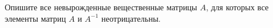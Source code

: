 \documentclass{article}
\begin{document}
Опишите все невырожденные вещественные матрицы $A$, для которых все элементы матриц $A$ и $A^{-1}$ неотрицательны.
\end{document}
